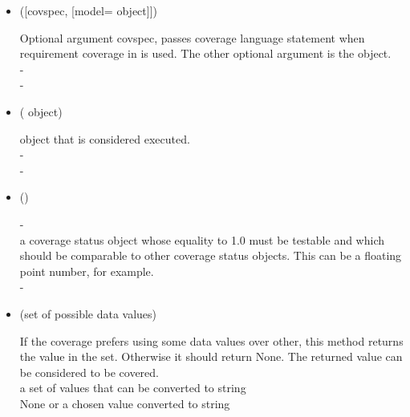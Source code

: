 \documentclass{article}
\begin{document}
\begin{itemize}
\item[] ([covspec, [model= object]])
  \begin{quot}
     Optional argument covspec, passes coverage language
    statement when requirement coverage in  is
    used. The other optional argument is the  object.\\
     -\\
     -
  \end{quot}
\item[] ( object)
  \begin{quot}
      object that is considered executed.\\
     -\\
     -\\
  \end{quot}
\item[] ()
  \begin{quot}
     -\\
     a coverage status object whose equality to 1.0
    must be testable and which should be comparable to other coverage
    status objects. This can be a floating point number, for example.\\
     -\\
  \end{quot}
\item[] (set of possible data values)
  \begin{quot}
    If the coverage prefers using some data values over other, this
    method returns the value in the set. Otherwise it should return
    None. The returned value can be considered to be covered.\\
     a set of values that can be converted to string\\
     None or a chosen value converted to string\\

\end{quot}
\end{itemize}
\end{document}
